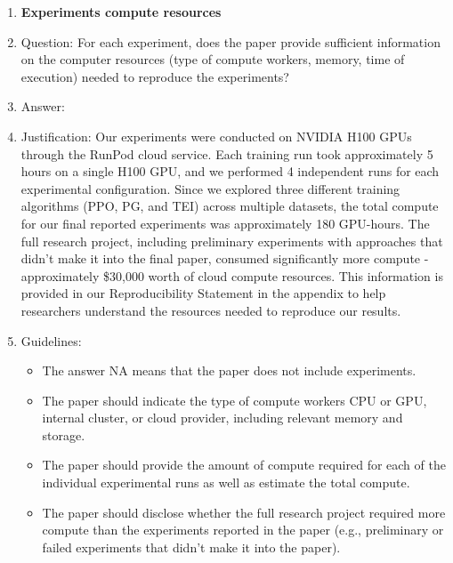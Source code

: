 \documentclass{article}
\begin{document}
\begin{enumerate}
\item {\bf Experiments compute resources}
    \item[] Question: For each experiment, does the paper provide sufficient information on the computer resources (type of compute workers, memory, time of execution) needed to reproduce the experiments?
    \item[] Answer: \answerYes{} %
    \item[] Justification: Our experiments were conducted on NVIDIA H100 GPUs through the RunPod cloud service. Each training run took approximately 5 hours on a single H100 GPU, and we performed 4 independent runs for each experimental configuration. Since we explored three different training algorithms (PPO, PG, and TEI) across multiple datasets, the total compute for our final reported experiments was approximately 180 GPU-hours. The full research project, including preliminary experiments with approaches that didn't make it into the final paper, consumed significantly more compute - approximately \$30,000 worth of cloud compute resources. This information is provided in our Reproducibility Statement in the appendix to help researchers understand the resources needed to reproduce our results.
    \item[] Guidelines:
    \begin{itemize}
        \item The answer NA means that the paper does not include experiments.
        \item The paper should indicate the type of compute workers CPU or GPU, internal cluster, or cloud provider, including relevant memory and storage.
        \item The paper should provide the amount of compute required for each of the individual experimental runs as well as estimate the total compute. 
        \item The paper should disclose whether the full research project required more compute than the experiments reported in the paper (e.g., preliminary or failed experiments that didn't make it into the paper). 
    \end{itemize}
    

\end{enumerate}
\end{document}
